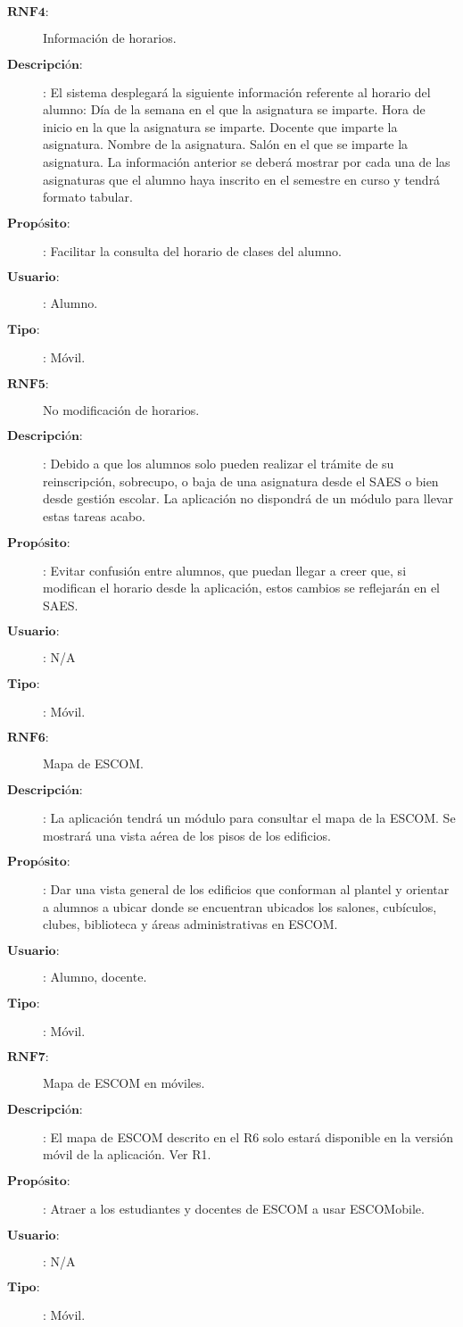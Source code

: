 \begin{description}
\item[$\textbf{RNF4:}$] Información de horarios.
\item[$\textbf{Descripción:}$]:  El sistema desplegará la siguiente información referente al horario del alumno:
Día de la semana en el que la asignatura se imparte.
Hora de inicio en la que la asignatura se imparte.
Docente que imparte la asignatura.
Nombre de la asignatura.
Salón en el que se imparte la asignatura.
La información anterior se deberá mostrar por cada una de las asignaturas que el alumno haya inscrito en el semestre en curso y tendrá formato tabular.
\item[$\textbf{Propósito:}$]: Facilitar la consulta del horario de clases del alumno.
\item[$\textbf{Usuario:}$]: Alumno.
\item[$\textbf{Tipo:}$]: Móvil. \\

\item[$\textbf{RNF5:}$] No modificación de horarios.
\item[$\textbf{Descripción:}$]:  Debido a que los alumnos solo pueden realizar el trámite de su reinscripción, sobrecupo, o baja de una asignatura desde el SAES o bien desde gestión escolar. La aplicación no dispondrá de un módulo para llevar estas tareas acabo.
\item[$\textbf{Propósito:}$]: Evitar confusión entre alumnos, que puedan llegar a creer que, si modifican el horario desde la aplicación, estos cambios se reflejarán en el SAES.
\item[$\textbf{Usuario:}$]: N/A
\item[$\textbf{Tipo:}$]: Móvil. \\

\item[$\textbf{RNF6:}$] Mapa de ESCOM.
\item[$\textbf{Descripción:}$]:  La aplicación tendrá un módulo para consultar el mapa de la ESCOM. Se mostrará una vista aérea de los pisos de los edificios.
\item[$\textbf{Propósito:}$]: Dar una vista general de los edificios que conforman al plantel y orientar a alumnos a ubicar donde se encuentran ubicados los salones, cubículos, clubes, biblioteca y áreas administrativas en ESCOM.
\item[$\textbf{Usuario:}$]: Alumno, docente.
\item[$\textbf{Tipo:}$]: Móvil. \\

\item[$\textbf{RNF7:}$] Mapa de ESCOM en móviles.
\item[$\textbf{Descripción:}$]:  El mapa de ESCOM descrito en el R6 solo estará disponible en la versión móvil de la aplicación. Ver R1.
\item[$\textbf{Propósito:}$]: Atraer a los estudiantes y docentes de ESCOM a usar ESCOMobile.
\item[$\textbf{Usuario:}$]: N/A
\item[$\textbf{Tipo:}$]: Móvil. \\



\end{description}
